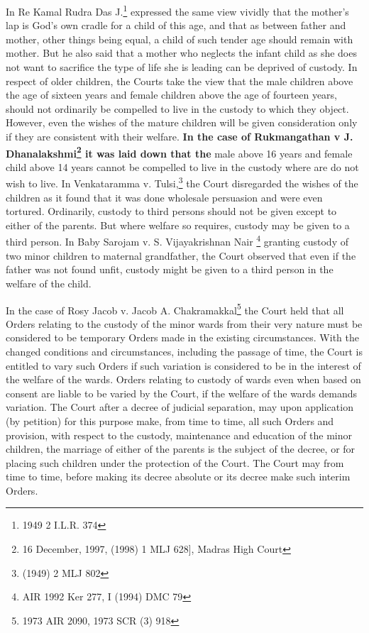\begin{multicols}{2}
\noi
In Re Kamal Rudra Das J.\footnote{1949 2 I.L.R. 374} expressed the same view vividly that the mother's lap is God's own
cradle for a child of this age, and that as between father and mother, other things being equal, a
child of such tender age should remain with mother. But he also said that a mother who neglects
the infant child as she does not want to sacrifice the type of life she is leading can be deprived of
custody. In respect of older children, the Courts take the view that the male children above the
age of sixteen years and female children above the age of fourteen years, should not ordinarily be
compelled to live in the custody to which they object. However, even the wishes of the mature
children will be given consideration only if they are consistent with their welfare. \textbf{In the case
of Rukmangathan v J. Dhanalakshmi\footnote{16 December, 1997, (1998) 1 MLJ 628], Madras High Court} it was laid down that the} male above 16 years and female child above 14 years cannot be compelled to live in the custody where are do not wish to live. In Venkataramma v. Tulsi,\footnote{(1949) 2 MLJ 802} the Court disregarded the wishes of the children as it found that it was done wholesale persuasion and were even tortured. Ordinarily,
custody to third persons should not be given except to either of the parents. But where welfare so
requires, custody may be given to a third person. In Baby Sarojam v. S. Vijayakrishnan Nair \footnote{AIR 1992 Ker 277, I (1994) DMC 79} granting custody of two minor children to maternal grandfather, the Court observed that even if the father was not found unfit, custody might be given to a third person in the welfare of the child.

\newpage

\noi
In the case of Rosy Jacob v. Jacob A. Chakramakkal\footnote{1973 AIR 2090, 1973 SCR (3) 918} the Court held that all Orders relating to the custody of the minor wards from their very nature must be considered to be temporary Orders made in the existing circumstances. With the changed conditions and circumstances, including the passage of time, the Court is entitled to vary such Orders if such variation is considered to be in the interest of the welfare of the wards. Orders relating to custody of wards even when based on consent are liable to be varied by the Court, if the welfare of the wards demands variation. The Court after a decree of judicial separation, may upon application (by petition) for this purpose make, from time to time, all such Orders and provision, with respect to the custody, maintenance and education of the minor children, the marriage of either of the parents is the subject of the decree, or for placing such children under the protection of the Court. The Court may from time
to time, before making its decree absolute or its decree make such interim Orders.


\end{multicols}
